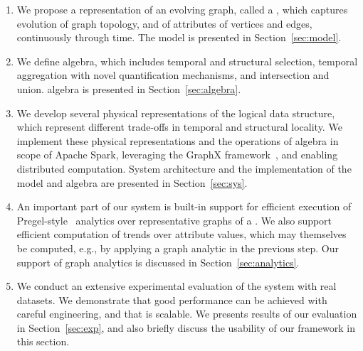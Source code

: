 \begin{enumerate}[noitemsep,leftmargin=*]

\item We propose a representation of an evolving graph, called a \tg,
  which captures evolution of graph topology, and of attributes of
  vertices and edges, continuously through time.  The \tg model is presented in
  Section~\ref{sec:model}.

\item We define \tg algebra, which includes temporal and structural
  selection, temporal aggregation with novel quantification
  mechanisms, and \tg intersection and union.  \tg algebra is presented in
  Section~\ref{sec:algebra}.

\item We develop several physical representations of the logical \tg
  data structure, which represent different trade-offs in temporal and
  structural locality.  We implement these physical representations
  and the operations of \tg algebra in scope of Apache Spark,
  leveraging the GraphX
  framework~\cite{DBLP:conf/osdi/GonzalezXDCFS14}, and enabling
  distributed computation. System architecture and the implementation
  of the \tg model and algebra are presented in Section~\ref{sec:sys}.

\item An important part of our system is built-in support for
  efficient execution of
  Pregel-style~\cite{DBLP:conf/sigmod/MalewiczABDHLC10} analytics over
  representative graphs of a \tg.  We also support efficient
  computation of trends over attribute values, which may themselves be
  computed, e.g., by applying a graph analytic in the previous step.
  Our support of graph analytics is discussed in
  Section~\ref{sec:analytics}.

\item We conduct an extensive experimental evaluation of the \ql
  system with real datasets.  We demonstrate that good performance can
  be achieved with careful engineering, and that \ql is scalable.  We
  presents results of our evaluation in Section~\ref{sec:exp}, and
  also briefly discuss the usability of our framework in this section.

\end{enumerate}

